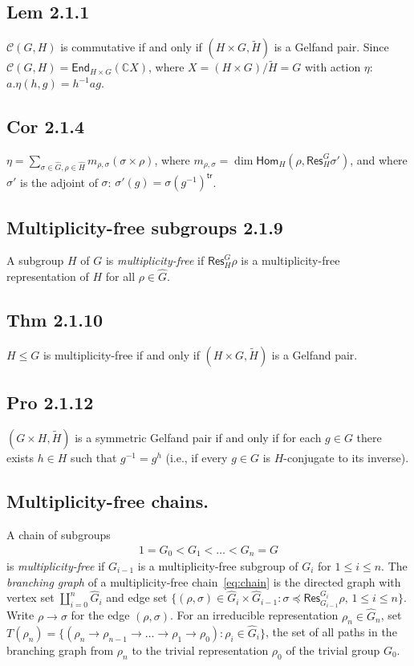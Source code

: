 \documentclass[a4paper]{amsart}
\newcommand{\C}{\mathbb{C}}
\newcommand{\CC}{\mathcal{C}}
\newcommand{\Hom}{\mathsf{Hom}}
\newcommand{\End}{\mathsf{End}}
\newcommand{\Res}{\mathsf{Res}}
\begin{document}
\subsection{Lem 2.1.1}
$\CC(G, H)$ is commutative if and only if $(H \times G, \tilde{H})$ is
a Gelfand pair.  Since $\CC(G, H) = \End_{H \times G}(\C X)$, where $X
= (H \times G)/\tilde{H} = G$ with action $\eta:$ $a.\eta(h,g) = h^{-1}a g$.


\subsection{Cor 2.1.4}
$\eta = \sum_{\sigma \in \hat{G}, \rho \in \hat{H}} m_{\rho, \sigma} (\sigma \times \rho)$, where 
$m_{\rho, \sigma} = \dim \Hom_H(\rho, \Res^G_H \sigma')$,
and where $\sigma'$ is the adjoint of $\sigma$: $\sigma'(g) = \sigma(g^{-1})^{\mathsf{tr}}$.



\subsection{Multiplicity-free subgroups 2.1.9}
A subgroup $H$ of $G$ is \emph{multiplicity-free} if
$\Res^G_H \rho$ is a multiplicity-free representation of $H$ for all 
$\rho \in \hat{G}$.


\subsection{Thm 2.1.10} $H \leq G$ is multiplicity-free if and only if
$(H \times G, \tilde{H})$ is
a Gelfand pair.


\subsection{Pro 2.1.12} 
$(G \times H, \tilde{H})$ is a symmetric Gelfand pair if and only if 
for each $g \in G$ there exists $h \in H$ such that $g^{-1} = g^h$
(i.e., if every $g \in G$ is $H$-conjugate to its inverse).

\subsection{Multiplicity-free chains.}
A chain of subgroups 
\begin{align*} \label{eq:chain} \tag{$*$}
1 = G_0 < G_1 < \dots < G_n = G
\end{align*}
is
\emph{multiplicity-free} if $G_{i-1}$ is a multiplicity-free subgroup
of $G_i$ for  $1 \leq i \leq n$.
The \emph{branching graph} of  a multiplicity-free chain~\eqref{eq:chain} is the directed graph with  vertex set
$\coprod_{i=0}^n \hat{G}_i$
and edge set $\{(\rho, \sigma) \in \hat{G}_i \times \hat{G}_{i-1} : \sigma \preceq \Res^{G_i}_{G_{i-1}} \rho,\, 1  \leq i \leq n \}$.  Write $\rho \to \sigma$ for the edge $(\rho, \sigma)$.
For an irreducible representation $\rho_n \in \hat{G}_n$, set $T(\rho_n) = \{ (\rho_n \to \rho_{n-1} \to \dots \to \rho_1 \to \rho_0) : \rho_i \in \hat{G}_i\}$,
the set of all paths in the branching graph from $\rho_n$ to the
trivial representation $\rho_0$ of the trivial group $G_0$.
\end{document}
